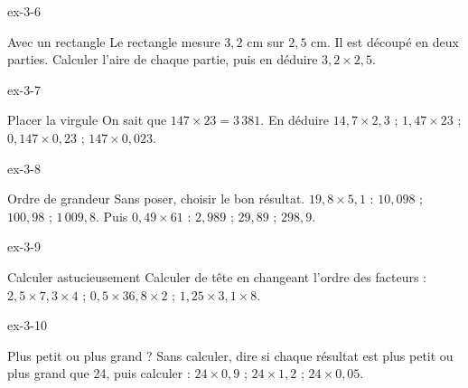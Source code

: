 \begin{blocLivre}{ex-3-6}\begin{exercice}[2]{Avec un rectangle}
Le rectangle mesure $3{,}2$ cm sur $2{,}5$ cm. Il est découpé en deux parties. Calculer l’aire de chaque partie, puis en déduire $3{,}2\times2{,}5$.
\label{fig-ex-3-6}
\end{exercice}\end{blocLivre}
\begin{blocLivre}{ex-3-7}\begin{exercice}[2]{Placer la virgule}
On sait que $147\times23=3\,381$. En déduire $14{,}7\times2{,}3$ ; $1{,}47\times23$ ; $0{,}147\times0{,}23$ ; $147\times0{,}023$.
\end{exercice}\end{blocLivre}
\begin{blocLivre}{ex-3-8}\begin{exercice}[2]{Ordre de grandeur}
Sans poser, choisir le bon résultat. $19{,}8\times5{,}1$ : $10{,}098$ ; $100{,}98$ ; $1\,009{,}8$. Puis $0{,}49\times61$ : $2{,}989$ ; $29{,}89$ ; $298{,}9$.
\end{exercice}\end{blocLivre}
\begin{blocLivre}{ex-3-9}\begin{exercice}[2]{Calculer astucieusement}
Calculer de tête en changeant l’ordre des facteurs : $2{,}5\times7{,}3\times4$ ; $0{,}5\times36{,}8\times2$ ; $1{,}25\times3{,}1\times8$.
\end{exercice}\end{blocLivre}
\begin{blocLivre}{ex-3-10}\begin{exercice}[2]{Plus petit ou plus grand ?}
Sans calculer, dire si chaque résultat est plus petit ou plus grand que 24, puis calculer : $24\times0{,}9$ ; $24\times1{,}2$ ; $24\times0{,}05$.
\end{exercice}\end{blocLivre}

